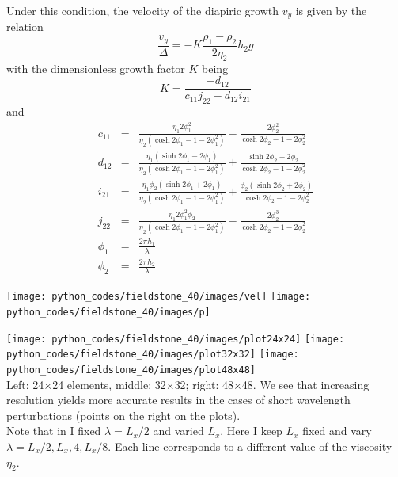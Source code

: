 Under this condition, the velocity of the diapiric growth
$v_y$ is given by the relation
\[
\frac{v_y}{\Delta} = - K \frac{\rho_1-\rho_2}{2 \eta_2} h_2 g
\]
with the dimensionless growth factor $K$ being
\[
K=\frac{-d_{12}}{c_{11}j_{22}-d_{12}i_{21}}
\]
and 
\begin{eqnarray}
c_{11} &=& \frac{\eta_1 2 \phi_1^2}{\eta_2(\cosh 2\phi_1 - 1 - 2\phi_1^2)} - \frac{2\phi_2^2}{\cosh 2\phi_2 - 1 - 2 \phi_2^2}\\
d_{12} &=& \frac{\eta_1(\sinh 2\phi_1 -2\phi_1)}{\eta_2(\cosh 2\phi_1 -1 -2\phi_1^2)} + \frac{\sinh 2\phi_2 - 2\phi_2}{\cosh 2\phi_2 -1 -2\phi_2^2} \\
i_{21} &=& \frac{\eta_1\phi_2 (\sinh 2 \phi_1 + 2 \phi_1)}{\eta_2(\cosh 2\phi_1 -1 -2\phi_1^2)} 
+ \frac{\phi_2 (\sinh 2\phi_2 + 2\phi_2)}{\cosh 2\phi_2 -1 -2\phi_2^2} \\
j_{22} &=& \frac{\eta_1 2 \phi_1^2 \phi_2}{\eta_2(\cosh 2\phi_1 -1-2\phi_1^2)} - \frac{2\phi_2^3}{ \cosh 2\phi_2 -1 -2\phi_2^2}\\
\phi_1&=&\frac{2\pi h_1}{\lambda}\\
\phi_2&=&\frac{2\pi h_2}{\lambda}
\end{eqnarray}


\begin{center}
\texttt{[image: python\_codes/fieldstone\_40/images/vel]}
\texttt{[image: python\_codes/fieldstone\_40/images/p]}
\end{center}


\begin{center}
\texttt{[image: python\_codes/fieldstone\_40/images/plot24x24]}
\texttt{[image: python\_codes/fieldstone\_40/images/plot32x32]}
\texttt{[image: python\_codes/fieldstone\_40/images/plot48x48]}\\
{\captionfont  Left: 24$\times$24 elements, middle: 32$\times$32; right: 48$\times$48. We see that 
increasing resolution yields more accurate results in the cases of short wavelength 
perturbations (points on the right on the plots).\\  
Note that in \cite{thie11} I fixed $\lambda=L_x/2$ and varied $L_x$. Here I keep $L_x$ fixed
and vary $\lambda=L_x/2,L_x,4,L_x/8$. Each line corresponds to a different value of the viscosity $\eta_2$.} 
\end{center}


